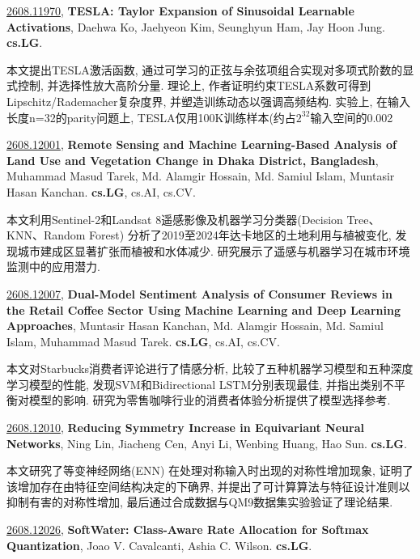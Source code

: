 \documentclass[9pt, a4paper]{article}
\theoremstyle{plain}
\theoremstyle{definition}
\theoremstyle{remark}
\newcommand{\arxivwithtarget}[3]{\hypertarget{#1}{}\href{https://arxiv.org/abs/#1}{#1}, \textbf{\textcolor{arxivblue}{#2}}, #3. }
\begin{document}
\arxivwithtarget{2608.11970}{TESLA: Taylor Expansion of Sinusoidal Learnable Activations}{Daehwa Ko, Jaehyeon Kim, Seunghyun Ham, Jay Hoon Jung}\textbf{cs.LG}.

本文提出TESLA激活函数, 通过可学习的正弦与余弦项组合实现对多项式阶数的显式控制, 并选择性放大高阶分量. 理论上, 作者证明约束TESLA系数可得到Lipschitz/Rademacher复杂度界, 并塑造训练动态以强调高频结构. 实验上, 在输入长度n=32的parity问题上, TESLA仅用100K训练样本(约占$2^{32}$输入空间的0.002%


\arxivwithtarget{2608.12001}{Remote Sensing and Machine Learning-Based Analysis of Land Use and Vegetation Change in Dhaka District, Bangladesh}{Muhammad Masud Tarek, Md. Alamgir Hossain, Md. Samiul Islam, Muntasir Hasan Kanchan}\textbf{cs.LG}, cs.AI, cs.CV.

本文利用Sentinel-2和Landsat 8遥感影像及机器学习分类器(Decision Tree、KNN、Random Forest) 分析了2019至2024年达卡地区的土地利用与植被变化, 发现城市建成区显著扩张而植被和水体减少. 研究展示了遥感与机器学习在城市环境监测中的应用潜力.


\arxivwithtarget{2608.12007}{Dual-Model Sentiment Analysis of Consumer Reviews in the Retail Coffee Sector Using Machine Learning and Deep Learning Approaches}{Muntasir Hasan Kanchan, Md. Alamgir Hossain, Md. Samiul Islam, Muhammad Masud Tarek}\textbf{cs.LG}, cs.AI, cs.CV.

本文对Starbucks消费者评论进行了情感分析, 比较了五种机器学习模型和五种深度学习模型的性能, 发现SVM和Bidirectional LSTM分别表现最佳, 并指出类别不平衡对模型的影响. 研究为零售咖啡行业的消费者体验分析提供了模型选择参考.


\arxivwithtarget{2608.12010}{Reducing Symmetry Increase in Equivariant Neural Networks}{Ning Lin, Jiacheng Cen, Anyi Li, Wenbing Huang, Hao Sun}\textbf{cs.LG}.

本文研究了等变神经网络(ENN) 在处理对称输入时出现的对称性增加现象, 证明了该增加存在由特征空间结构决定的下确界, 并提出了可计算算法与特征设计准则以抑制有害的对称性增加, 最后通过合成数据与QM9数据集实验验证了理论结果.


\arxivwithtarget{2608.12026}{SoftWater: Class-Aware Rate Allocation for Softmax Quantization}{Joao V. Cavalcanti, Ashia C. Wilson}\textbf{cs.LG}.
\end{document}
